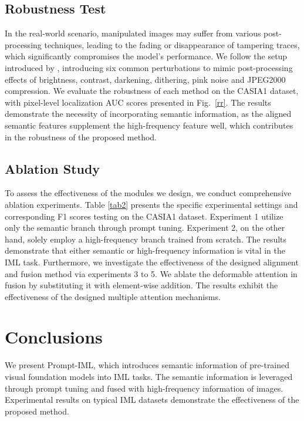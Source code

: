 \documentclass{article}
\begin{document}
\subsection{Robustness Test}
In the real-world scenario, manipulated images may suffer from various post-processing techniques, leading to the fading or disappearance of tampering traces, which significantly compromises the model's performance. 
We follow the setup introduced by \cite{PIM}, introducing six common perturbations to mimic post-processing effects of brightness, contrast, darkening, dithering, pink noise and JPEG2000 compression.
We evaluate the robustness of each method on the CASIA1 dataset, with pixel-level localization AUC scores presented in Fig.~\ref{rr}. 
The results demonstrate the necessity of incorporating semantic information, as the aligned semantic features supplement the high-frequency feature well, which contributes in the robustness of the proposed method.



\subsection{Ablation Study}
To assess the effectiveness of the modules we design, we conduct comprehensive ablation experiments. Table \ref{tab2} presents the specific experimental settings and corresponding F1 scores testing on the CASIA1 dataset. Experiment 1 utilize only the semantic branch through prompt tuning. Experiment 2, on the other hand, solely employ a high-frequency branch trained from scratch. The results demonstrate that either semantic or high-frequency information is vital in the IML task.
Furthermore, we investigate the effectiveness of the designed alignment and fusion method via experiments 3 to 5.
We ablate the deformable attention in fusion by substituting it with element-wise addition.
The results exhibit the effectiveness of the designed multiple attention mechanisms.

\section{Conclusions}
We present Prompt-IML, which introduces semantic information of pre-trained visual foundation models into IML tasks. The semantic information is leveraged through prompt tuning and fused with high-frequency information of images. Experimental results on typical IML datasets demonstrate the effectiveness of the proposed method. 
\end{document}
